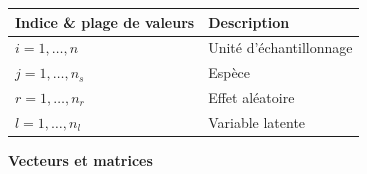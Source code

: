 \documentclass[12pt,]{article}
\begin{document}
{\small
\begin{longtable}[l]{@{}ll@{}}
\toprule
\begin{minipage}[b]{0.39\columnwidth}\raggedright
Indice \& plage de valeurs\strut
\end{minipage} & \begin{minipage}[b]{0.39\columnwidth}\raggedright
Description\strut
\end{minipage}\tabularnewline
\midrule
\endhead
\begin{minipage}[t]{0.39\columnwidth}\raggedright
\(i = 1, \dots, n\)\strut
\end{minipage} & \begin{minipage}[t]{0.39\columnwidth}\raggedright
Unité d'échantillonnage\strut
\end{minipage}\tabularnewline
\begin{minipage}[t]{0.39\columnwidth}\raggedright
\(j = 1, \dots, n_s\)\strut
\end{minipage} & \begin{minipage}[t]{0.39\columnwidth}\raggedright
Espèce\strut
\end{minipage}\tabularnewline
\begin{minipage}[t]{0.39\columnwidth}\raggedright
\(r = 1, \dots, n_r\)\strut
\end{minipage} & \begin{minipage}[t]{0.39\columnwidth}\raggedright
Effet aléatoire\strut
\end{minipage}\tabularnewline
\begin{minipage}[t]{0.39\columnwidth}\raggedright
\(l = 1, \dots, n_l\)\strut
\end{minipage} & \begin{minipage}[t]{0.39\columnwidth}\raggedright
Variable latente\strut
\end{minipage}\tabularnewline
\bottomrule
\end{longtable}}\FloatBarrier


\textbf{Vecteurs et matrices}
\end{document}
